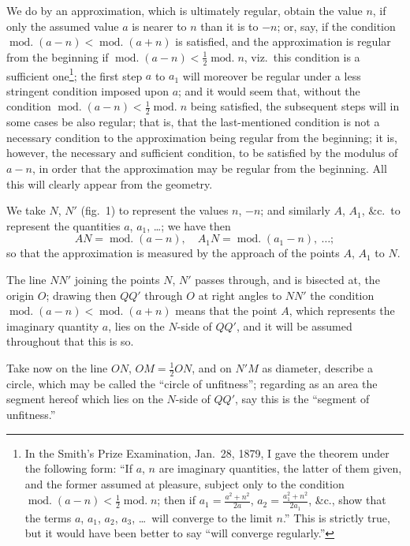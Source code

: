 \documentclass[11pt,a4paper]{book}
\begin{document}
We do by an approximation, which is ultimately regular, obtain the
value $n$, if only the assumed value $a$ is nearer to $n$ than it is to $-n$;
or, say, if the condition $\operatorname{mod.}(a-n)<\operatorname{mod.}(a+n)$ is satisfied, and
the approximation is regular from the beginning if
$\operatorname{mod.}(a-n)<\frac{1}{2}\operatorname{mod.}n$, viz.~this condition is a sufficient
one\footnote{In the Smith's Prize Examination, Jan.~28, 1879, I gave the theorem under
the following form: ``If $a$, $n$ are imaginary quantities, the latter of them given,
and the former assumed at pleasure, subject only to the condition
$\operatorname{mod.}(a-n)<\frac{1}{2}\operatorname{mod.}n$; then if
$a_1=\frac{a^2+n^2}{2a}$, $a_2=\frac{a_1^2+n^2}{2a_1}$, \&c., show that the terms
$a$, $a_1$, $a_2$, $a_3$, \dots\ will converge to the limit $n$.'' This is strictly true,
but it would have been better to say ``will converge regularly.''};
the first step $a$ to $a_1$ will moreover be regular under a less stringent
condition imposed upon $a$; and it would seem that, without the condition
$\operatorname{mod.}(a-n)<\frac{1}{2}\operatorname{mod.}n$ being satisfied, the subsequent
steps will in some cases be also regular; that is, that the last-mentioned
condition is not a necessary condition to the approximation being regular
from the beginning; it is, however, the necessary and sufficient condition,
to be satisfied by the modulus of $a-n$, in order that the approximation
may be regular from the beginning. All this will clearly appear from the
geometry.

We take $N$, $N'$ (fig.~1) to represent the values $n$, $-n$; and similarly
$A$, $A_1$, \&c.\ to represent the quantities $a$, $a_1$, \dots; we have then
\[
AN = \operatorname{mod.}(a-n),\quad A_1N = \operatorname{mod.}(a_1-n),\ \ldots;
\]
so that the approximation is measured by the approach of the points $A$,
$A_1$ to $N$.

The line $NN'$ joining the points $N$, $N'$ passes through, and is
bisected at, the origin $O$; drawing then $QQ'$ through $O$ at right angles
to $NN'$ the condition $\operatorname{mod.}(a-n)<\operatorname{mod.}(a+n)$ means that
the point $A$, which represents the imaginary quantity $a$, lies on the
$N$-side of $QQ'$, and it will be assumed throughout that this is so.

Take now on the line $ON$, $OM=\frac{1}{2}ON$, and on $N'M$ as diameter,
describe a circle, which may be called the ``circle of unfitness''; regarding
as an area the segment hereof which lies on the $N$-side of $QQ'$, say this
is the ``segment of unfitness.''
\end{document}
